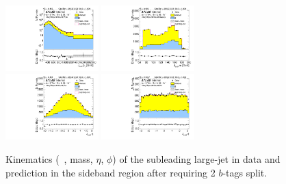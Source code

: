 \begin{figure}[htbp!]
\begin{center}
\includegraphics[width=0.32\textwidth,angle=-90]{figures/boosted/Sideband/b77_TwoTag_split_Sideband_sublHCand_Pt_m_1.pdf}
\includegraphics[width=0.32\textwidth,angle=-90]{figures/boosted/Sideband/b77_TwoTag_split_Sideband_sublHCand_Mass_s.pdf}\\
\includegraphics[width=0.32\textwidth,angle=-90]{figures/boosted/Sideband/b77_TwoTag_split_Sideband_sublHCand_Eta.pdf}
\includegraphics[width=0.32\textwidth,angle=-90]{figures/boosted/Sideband/b77_TwoTag_split_Sideband_sublHCand_Phi.pdf}
  \caption{Kinematics (\pt~, mass, $\eta$, $\phi$) of the subleading large-\R jet in data and prediction in the sideband region after requiring 2 $b$-tags split.}
  \label{fig:boosted-2bs-sideband-ak10-subl}
\end{center}
\end{figure}

